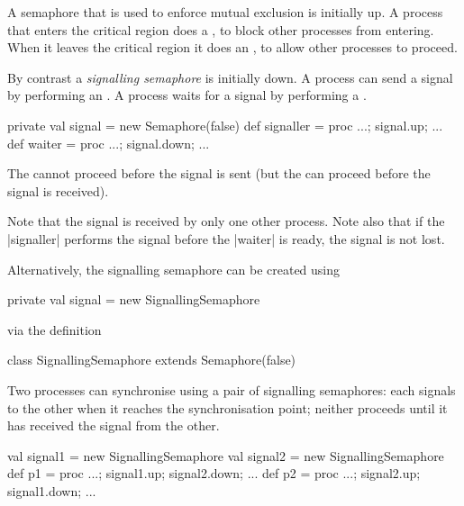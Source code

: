 
\begin{slide}

A semaphore that is used to enforce mutual exclusion is initially up.  A
process that enters the critical region does a , to block other
processes from entering.  When it leaves the critical region it does an
, to allow other processes to proceed.
\end{slide}



\begin{slide}

By contrast a \emph{signalling semaphore} is initially down.  A process can
send a signal by performing an .  A process waits for a signal by
performing a .
\begin{scala}
private val signal = new Semaphore(false)
def signaller = proc{ ...; signal.up; ... }
def waiter = proc{ ...; signal.down; ... }
\end{scala}  
The  cannot proceed before the signal is sent (but the
 can proceed before the signal is received).

Note that the signal is received by only one other process.  Note also that if
the |signaller| performs the signal before the |waiter| is ready, the signal
is not lost.
\end{slide}


\begin{slide}

Alternatively, the signalling semaphore can be created using
\begin{scala}
private val signal = new SignallingSemaphore
\end{scala}
via the definition
\begin{scala}
class SignallingSemaphore extends Semaphore(false)
\end{scala}
\end{slide}


\begin{slide}

Two processes can synchronise using a pair of signalling semaphores: each
signals to the other when it reaches the synchronisation point; neither
proceeds until it has received the signal from the other.
\begin{scala}
val signal1 = new SignallingSemaphore
val signal2 = new SignallingSemaphore
def p1 = proc{ ...; signal1.up; signal2.down; ... }
def p2 = proc{ ...; signal2.up; signal1.down; ... }
\end{scala}
\end{slide}


